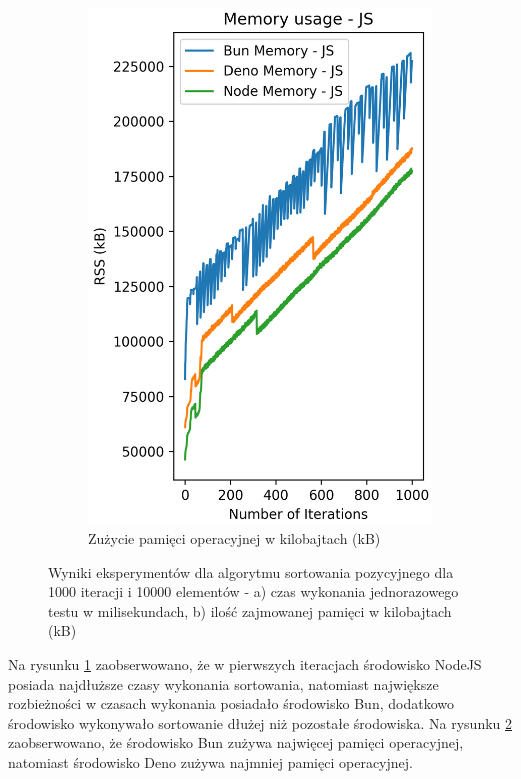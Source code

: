 \begin{figure}[H]
\begin{subfigure}[b]{0.44\textwidth}
    \label{fig:radix_sorting_e4_time}
  \end{subfigure}
  \begin{subfigure}[b]{0.44\textwidth}
    \centering
    \includegraphics[width=\textwidth]{Figures/sorting/sorting_radix_1000_10000_js_memory.png}
    \caption{Zużycie pamięci operacyjnej w kilobajtach (kB)}
    \label{fig:radix_sorting_e4_memory}
  \end{subfigure}
  \hfill
  \caption{Wyniki eksperymentów dla algorytmu sortowania pozycyjnego dla 1000 iteracji i 10000 elementów - a) czas wykonania jednorazowego testu w milisekundach, b) ilość zajmowanej pamięci w kilobajtach (kB)}
  \label{fig:radix_sorting_e4}
\end{figure}

Na rysunku \ref{fig:radix_sorting_e4_time} zaobserwowano, że w pierwszych iteracjach środowisko NodeJS posiada najdłuższe czasy wykonania sortowania, natomiast największe rozbieżności w czasach wykonania posiadało środowisko Bun, dodatkowo środowisko wykonywało sortowanie dłużej niż pozostałe środowiska. Na rysunku \ref{fig:radix_sorting_e4_memory} zaobserwowano, że środowisko Bun zużywa najwięcej pamięci operacyjnej, natomiast środowisko Deno zużywa najmniej pamięci operacyjnej.

